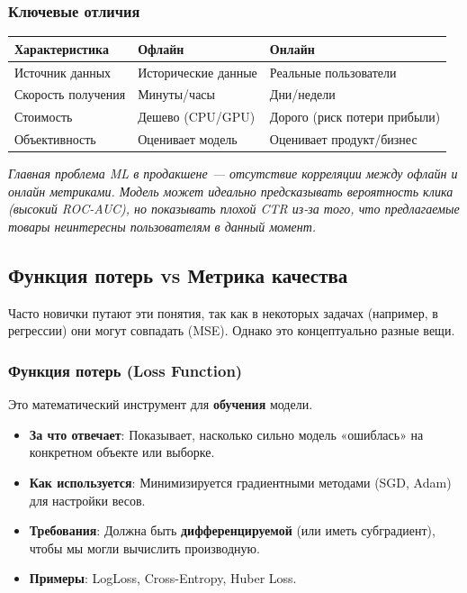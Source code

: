 \documentclass[12pt]{article}
\newcommand{\commentary}[1]{{\small\itshape\color{commentgray} #1}}
\begin{document}
\subsubsection{Ключевые отличия}
\begin{longtable}{@{}lll@{}}
\toprule
\textbf{Характеристика} & \textbf{Офлайн} & \textbf{Онлайн} \\ \midrule
Источник данных & Исторические данные & Реальные пользователи \\
Скорость получения & Минуты/часы & Дни/недели \\
Стоимость & Дешево (CPU/GPU) & Дорого (риск потери прибыли) \\
Объективность & Оценивает модель & Оценивает продукт/бизнес \\ \bottomrule
\end{longtable}

\commentary{Главная проблема ML в продакшене — отсутствие корреляции между офлайн и онлайн метриками. Модель может идеально предсказывать вероятность клика (высокий ROC-AUC), но показывать плохой CTR из-за того, что предлагаемые товары неинтересны пользователям в данный момент.}

\subsection{Функция потерь vs Метрика качества}

Часто новички путают эти понятия, так как в некоторых задачах (например, в регрессии) они могут совпадать (MSE). Однако это концептуально разные вещи.

\subsubsection{Функция потерь (Loss Function)}
Это математический инструмент для \textbf{обучения} модели.
\begin{itemize}
    \item \textbf{За что отвечает}: Показывает, насколько сильно модель «ошиблась» на конкретном объекте или выборке.
    \item \textbf{Как используется}: Минимизируется градиентными методами (SGD, Adam) для настройки весов.
    \item \textbf{Требования}: Должна быть \textbf{дифференцируемой} (или иметь субградиент), чтобы мы могли вычислить производную.
    \item \textbf{Примеры}: LogLoss, Cross-Entropy, Huber Loss.
\end{itemize}
\end{document}
